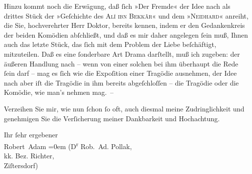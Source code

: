 \pstart
           Hinzu kommt noch die Erwägung, daß ſich »Der
                  Fremde« der Idee nach als drittes Stück der »Geſchichte des \textsc{Alî ibn Bekkâr}« und dem »\textsc{Neidhard}« anreiht, die Sie, hochverehrter Herr Doktor, bereits kennen, indem er den
               Gedankenkreis der beiden Komödien abſchließt, und daß es mir daher angelegen ſein
               muß, Ihnen auch das letzte Stück, das ſich mit {\pb}dem
               Problem der Liebe beſchäftigt, mitzuteilen. Daß es eine ſonderbare Art Drama
               darſtellt, muß ich zugeben: der äußeren Handlung nach – wenn von einer solchen bei
               ihm überhaupt die Rede ſein darf – mag es ſich wie die Expoſition einer Tragödie
               ausnehmen, der Idee nach aber iſt die Tragödie in ihm bereits abgeſchloſſen – die
               Tragödie oder die Komödie, wie man’s nehmen mag. –\pend
           
\pstart
           Verzeihen Sie mir, wie nun ſchon ſo oft, auch diesmal meine Zudringlichkeit und
               genehmigen Sie die Verſicherung meiner Dankbarkeit und Hochachtung.\pend
           
\pstart
           Ihr ſehr ergebener{\\[\baselineskip]}\spacefill\mbox{Robert Adam}\pend
           \leftskip=0em{}
\pstart
           \noindent{}\raggedleft{}(D\textsuperscript{r} Rob. Ad. Pollak,{\\}kk. Bez. Richter,{\\}Ziſtersdorf)\pend
           \endnumbering{}  
      